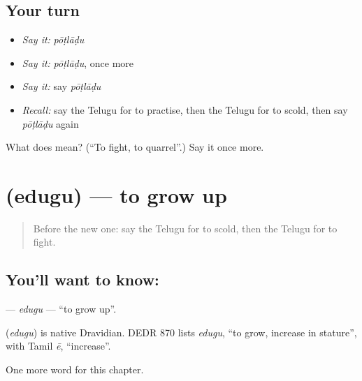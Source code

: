 \subsection*{Your turn}
\begin{itemize}
\raggedright
  \item \emph{Say it:} \emph{pōṭlāḍu}
  \item \emph{Say it:} \emph{pōṭlāḍu}, once more
  \item \emph{Say it:} say \emph{pōṭlāḍu}
  \item \emph{Recall:} say the Telugu for to practise, then the Telugu for to scold, then say \emph{pōṭlāḍu} again
\end{itemize}

\begin{tcolorbox}[breakable,colback=teal!4,colframe=teal!35!black,title={Before you move on}]
What does  mean? (\textquotedblleft{}To fight, to quarrel\textquotedblright{}.) Say it once more.
\end{tcolorbox}
\section[\texorpdfstring{\te{ఎదుగు} (edugu)}{ఎదుగు (edugu)}]{ (edugu) — to grow up}

\label{lesson:TE-C203-edugu}



\begin{quote}
Before the new one: say the Telugu for to scold, then the Telugu for to fight.
\end{quote}

\subsection*{You'll want to know: }
\textbf{} — \emph{edugu} — \textquotedblleft{}to grow up\textquotedblright{}.

\begin{cousinweb}
\textbf{} (\emph{edugu}) is native Dravidian. DEDR 870 lists \emph{edugu}, \textquotedblleft{}to grow, increase in stature\textquotedblright{}, with Tamil \emph{ē}, \textquotedblleft{}increase\textquotedblright{}.
\end{cousinweb}

\begin{grammarlens}[title={What you've built}]
One more word for this chapter.
\end{grammarlens}


